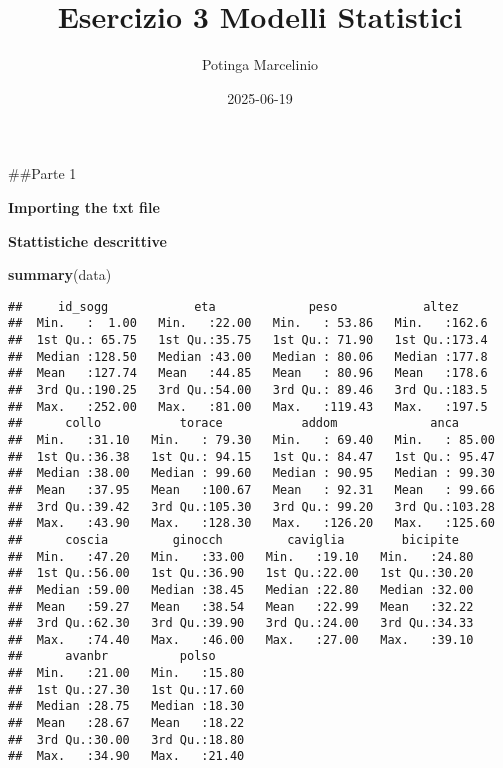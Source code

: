 \documentclass[
]{article}
\title{Esercizio 3 Modelli Statistici}
\author{Potinga Marcelinio}
\date{2025-06-19}
\newenvironment{Shaded}{\begin{snugshade}}{\end{snugshade}}
\newcommand{\AttributeTok}[1]{\textcolor[rgb]{0.13,0.29,0.53}{#1}}
\newcommand{\CommentTok}[1]{\textcolor[rgb]{0.56,0.35,0.01}{\textit{#1}}}
\newcommand{\FloatTok}[1]{\textcolor[rgb]{0.00,0.00,0.81}{#1}}
\newcommand{\FunctionTok}[1]{\textcolor[rgb]{0.13,0.29,0.53}{\textbf{#1}}}
\newcommand{\NormalTok}[1]{#1}
\newcommand{\OtherTok}[1]{\textcolor[rgb]{0.56,0.35,0.01}{#1}}
\newcommand{\SpecialCharTok}[1]{\textcolor[rgb]{0.81,0.36,0.00}{\textbf{#1}}}
\newcommand{\StringTok}[1]{\textcolor[rgb]{0.31,0.60,0.02}{#1}}
\begin{document}
\maketitle

\#\#Parte 1

\textbf{Importing the txt file}

\begin{Shaded}
\end{Shaded}

\textbf{Stattistiche descrittive}

\begin{Shaded}
\begin{Highlighting}[]
\FunctionTok{summary}\NormalTok{(data)}
\end{Highlighting}
\end{Shaded}

\begin{verbatim}
##     id_sogg            eta             peso            altez      
##  Min.   :  1.00   Min.   :22.00   Min.   : 53.86   Min.   :162.6  
##  1st Qu.: 65.75   1st Qu.:35.75   1st Qu.: 71.90   1st Qu.:173.4  
##  Median :128.50   Median :43.00   Median : 80.06   Median :177.8  
##  Mean   :127.74   Mean   :44.85   Mean   : 80.96   Mean   :178.6  
##  3rd Qu.:190.25   3rd Qu.:54.00   3rd Qu.: 89.46   3rd Qu.:183.5  
##  Max.   :252.00   Max.   :81.00   Max.   :119.43   Max.   :197.5  
##      collo           torace           addom             anca       
##  Min.   :31.10   Min.   : 79.30   Min.   : 69.40   Min.   : 85.00  
##  1st Qu.:36.38   1st Qu.: 94.15   1st Qu.: 84.47   1st Qu.: 95.47  
##  Median :38.00   Median : 99.60   Median : 90.95   Median : 99.30  
##  Mean   :37.95   Mean   :100.67   Mean   : 92.31   Mean   : 99.66  
##  3rd Qu.:39.42   3rd Qu.:105.30   3rd Qu.: 99.20   3rd Qu.:103.28  
##  Max.   :43.90   Max.   :128.30   Max.   :126.20   Max.   :125.60  
##      coscia         ginocch         caviglia        bicipite    
##  Min.   :47.20   Min.   :33.00   Min.   :19.10   Min.   :24.80  
##  1st Qu.:56.00   1st Qu.:36.90   1st Qu.:22.00   1st Qu.:30.20  
##  Median :59.00   Median :38.45   Median :22.80   Median :32.00  
##  Mean   :59.27   Mean   :38.54   Mean   :22.99   Mean   :32.22  
##  3rd Qu.:62.30   3rd Qu.:39.90   3rd Qu.:24.00   3rd Qu.:34.33  
##  Max.   :74.40   Max.   :46.00   Max.   :27.00   Max.   :39.10  
##      avanbr          polso      
##  Min.   :21.00   Min.   :15.80  
##  1st Qu.:27.30   1st Qu.:17.60  
##  Median :28.75   Median :18.30  
##  Mean   :28.67   Mean   :18.22  
##  3rd Qu.:30.00   3rd Qu.:18.80  
##  Max.   :34.90   Max.   :21.40
\end{verbatim}
\end{document}
